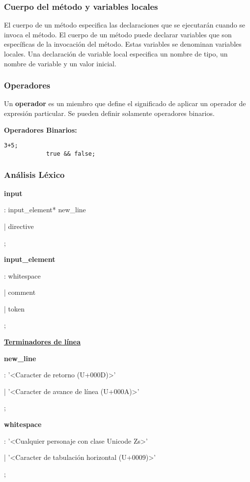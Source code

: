 	\subsubsection{Cuerpo del método y variables locales}
		El cuerpo de un método especifica las declaraciones que se ejecutarán cuando se invoca el método. El cuerpo de un método puede declarar variables que son específicas de la invocación del método. Estas variables se denominan variables locales. Una declaración de variable local especifica un nombre de tipo, un nombre de variable y un valor inicial.
		
	\subsubsection{Operadores}
		Un \textbf{operador} es un miembro que define el significado de aplicar un operador de expresión particular. Se pueden definir solamente operadores binarios.\par
		
		\textbf{Operadores Binarios:}
		\begin{lstlisting}[language={PySharp}]
			3+5;
			true && false;
		\end{lstlisting}

	\subsubsection{Análisis Léxico}
		\textbf{input}\par
		: input\_element* new\_line\par
		| directive\par
		;\par
		
		\textbf{input\_element}\par
		: whitespace\par
		| comment\par
		| token\par
		;\par
		
		\underline{\textbf{Terminadores de línea}}\par
		\textbf{new\_line}\par
		: '<Caracter de retorno (U+000D)>'\par
		| '<Caracter de avance de línea (U+000A)>'\par
		;\par
		
		\textbf{whitespace}\par
		: '<Cualquier personaje con clase Unicode Zs>'\par
		| '<Caracter de tabulación horizontal (U+0009)>'\par
		;\par
		
